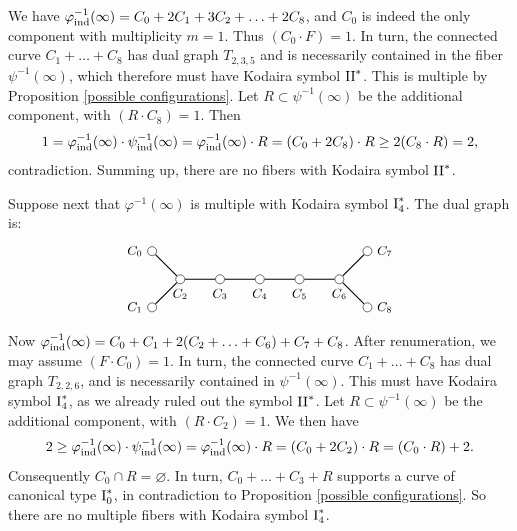 \documentclass[oneside, 12pt]{amsart}
\theoremstyle{definition}
\theoremstyle{remark}
\newcommand{\I}{\text{\rm I}}
\newcommand{\II}{\text{\rm II}}
\newcommand{\ind}{\text{\rm ind}}
\begin{document}
We have $\varphi^{-1}_\ind(\infty)=C_0+2C_1+3C_2+\ldots +2C_8$, and $C_0$ is indeed the only component  with multiplicity $m=1$.
Thus  $(C_0\cdot F)=1$.  
In turn, the connected curve $C_1+\ldots+C_8$ has dual graph $T_{2,3,5}$ and is necessarily contained in
the fiber $\psi^{-1}(\infty)$, which therefore must have Kodaira symbol $\II^*$. This is multiple by 
Proposition \ref{possible configurations}.
Let $R\subset\psi^{-1}(\infty)$ be the additional component, with $(R\cdot C_8)=1$.
Then 
$$
1=\varphi^{-1}_\ind(\infty)\cdot\psi^{-1}_\ind(\infty) =  \varphi^{-1}_\ind(\infty)\cdot R= (C_0+2C_8)\cdot R\geq 2(C_8\cdot R)=2,
$$
contradiction. Summing up, there are no fibers with Kodaira symbol $\II^*$.

Suppose next that $\varphi^{-1}(\infty)$ is multiple with Kodaira symbol $\I_4^*$.
The dual graph is:
\begin{equation*}
\begin{gathered}
\begin{tikzpicture}
[node distance=1cm, font=\small]

\tikzstyle{vertex}=[circle, draw, fill=white, inner sep=0mm, minimum size=1.5ex]
\node[vertex]	(C2)  	at (1,0) 	[label=below:{$C_2$}] 		{};
\node[vertex]	(C3)			[right of=C2, label=below:{$C_3$}]	{};
\node[vertex]	(C4)			[right of=C3, label=below:{$C_4$}]	{};
\node[vertex]	(C5)			[right of=C4, label=below:{$C_5$}]	{};
\node[vertex]	(C6)			[right of=C5, label=below:{$C_6$}]	{};

\node[vertex]	(C7)			[above right of=C6, label=right:{$C_7$}]	{};
\node[vertex]	(C8)			[below right of=C6, label=right:{$C_8$}]	{};
\node[vertex]	(C0)			[above left  of=C2, label=left :{$C_0$}]	{};
\node[vertex]	(C1)			[below left  of=C2, label=left :{$C_1$}]	{};

\draw [thick] (C2)--(C3)--(C4)--(C5)--(C6);
\draw [thick] (C0)--(C2)--(C1);
\draw [thick] (C7)--(C6)--(C8);
\end{tikzpicture}
\end{gathered}
\end{equation*}
Now $\varphi^{-1}_\ind(\infty) = C_0+C_1+2(C_2+\ldots+C_6)+C_7+C_8$.
After renumeration, we may assume $(F\cdot C_0)=1$.
In turn, the connected curve $C_1+\ldots+C_8$ has dual graph $T_{2,2,6}$, and is necessarily contained
in $\psi^{-1}(\infty)$. This must have Kodaira symbol $\I_4^*$, as we already ruled out the symbol $\II^*$.
Let $R\subset \psi^{-1}(\infty)$ be the additional component, with $(R\cdot C_2)=1$.
We then have
$$
2\geq \varphi^{-1}_\ind(\infty)\cdot \psi^{-1}_\ind(\infty) = \varphi^{-1}_\ind(\infty)\cdot R = (C_0+2C_2)\cdot R=(C_0\cdot R)+2.
$$
Consequently $C_0\cap R=\varnothing$. In turn, $C_0+\ldots+C_3+R$ supports a curve of canonical type $\I_0^*$, 
in contradiction to Proposition \ref{possible configurations}.
So there are no multiple fibers with Kodaira symbol $\I_4^*$.
\end{document}
